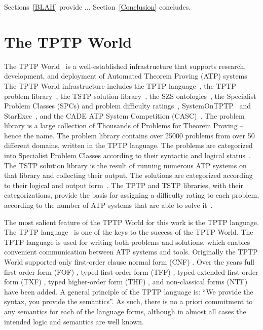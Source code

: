 \documentclass[runningheads]{llncs}
\begin{document}
Sections~\ref{BLAH} provide ...
Section~\ref{Conclusion} concludes.

\section{The TPTP World}
\label{TPTP}


The TPTP World~\cite{Sut24} is a well-established infrastructure that supports research, 
development, and deployment of Automated Theorem Proving (ATP) systems %
The TPTP World infrastructure includes
the TPTP language~\cite{SS+06},
the TPTP problem library~\cite{Sut09},
the TSTP solution library~\cite{Sut10},
the SZS ontologies~\cite{Sut08-KEAPPA},
the Specialist Problem Classes (SPCs) and problem difficulty ratings~\cite{SS01},
SystemOnTPTP~\cite{Sut00-CADE-17} and StarExec~\cite{SST14},
and the CADE ATP System Competition (CASC)~\cite{Sut16}.
The problem library is a large collection of Thousands of Problems for Theorem Proving -- hence 
the name. 
The problem library contains over 25000 problems from over 50 different domains, written in the 
TPTP language.
The problems are categorized into Specialist Problem Classes according to their syntactic and
logical status~\cite{Sut08-KEAPPA}.
The TSTP solution library is the result of running numerous ATP systems on that library and 
collecting their output. 
The solutions are categorized according to their logical and output form~\cite{Sut08-KEAPPA}.
The TPTP and TSTP libraries, with their categorizations, provide the basis for assigning a difficulty 
rating to each problem, according to the number of ATP systems that are able to solve 
it~\cite{SS01}.

The most salient feature of the TPTP World for this work is the TPTP language.
The TPTP language~\cite{Sut23-IGPL} is one of the keys to the success of the TPTP World.
The TPTP language is used for writing both problems and solutions,
which enables convenient communication between ATP systems and tools.
Originally the TPTP World supported only first-order clause normal form (CNF)
\cite{SS98-JAR}.
Over the years full first-order form (FOF)
\cite{Sut09}, 
typed first-order form (TFF)
\cite{SS+12,BP13-TFF1}, 
typed extended first-order form (TXF)
\cite{SK18}, 
typed higher-order form (THF)
\cite{SB10,KSR16}, 
and non-classical forms (NTF)~\cite{SF+22} have been added.
A general principle of the TPTP language is: ``We provide the syntax, you provide the semantics''.
As such, there is no a priori commitment to any semantics for each of the language forms, 
although in almost all cases the intended logic and semantics are well known.
\end{document}
